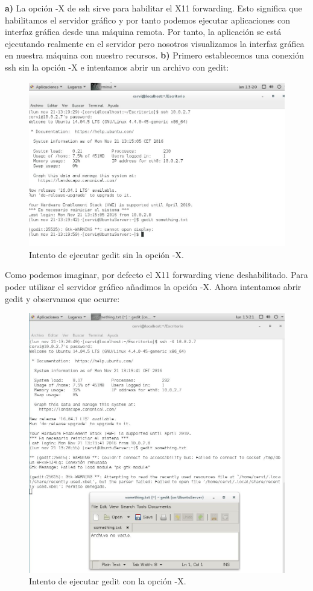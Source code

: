 \textbf{a)} La opción -X de ssh sirve para habilitar el X11 forwarding. Esto significa que habilitamos
el servidor gráfico y por tanto podemos ejecutar aplicaciones con interfaz gráfica desde una máquina
remota. Por tanto, la aplicación se está ejecutando realmente en el servidor pero nosotros visualizamos
la interfaz gráfica en nuestra máquina con nuestro recursos.\newline
\textbf{b)} Primero establecemos una conexión ssh sin la opción -X e intentamos abrir un archivo con gedit:
\begin{figure}[H]
	\centering
	\includegraphics[scale=0.6]{ssh-no-x.jpg}
	\caption{Intento de ejecutar gedit sin la opción -X. \label{fig:figura10}}
\end{figure}
Como podemos imaginar, por defecto el X11 forwarding viene deshabilitado. Para poder utilizar el servidor gráfico añadimos la opción -X. Ahora intentamos abrir gedit y observamos que ocurre:
\begin{figure}[H]
	\centering
	\includegraphics[scale=0.6]{ssh-X.jpg}
	\caption{Intento de ejecutar gedit con la opción -X. \label{fig:figura11}}
\end{figure}
